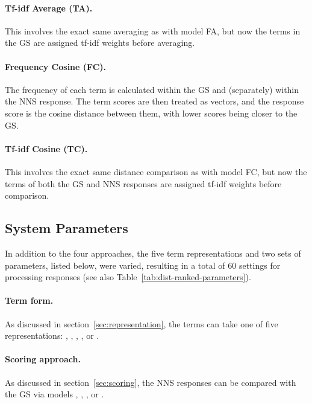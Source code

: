 \paragraph{Tf-idf Average (TA).} This involves the exact same
averaging as with model FA, but now the terms in the GS are assigned
tf-idf weights before averaging.

\paragraph{Frequency Cosine (FC).} The frequency of each term is
calculated within the GS and (separately) within the NNS response. 
The term scores are then treated as vectors, and the response score is
the cosine distance between them, with lower scores being closer to
the GS.

\paragraph{Tf-idf Cosine (TC).} This involves the exact same
distance comparison as with model FC, but now the terms of both the GS
and NNS responses are assigned tf-idf weights before comparison.

\subsection{System Parameters}
\label{sec:parameters}

In addition to the four approaches, the five term representations and
two sets of parameters, listed below, were varied, resulting in a total of
60 settings for processing responses (see also
Table~\ref{tab:dist-ranked-parameters}). 

\paragraph{Term form.} As discussed in
section~\ref{sec:representation}, the terms can take one of five
representations: , , , ,
or .

\paragraph{Scoring approach.} As discussed in
section~\ref{sec:scoring}, the NNS responses can be
compared with the GS via models , , , or .

